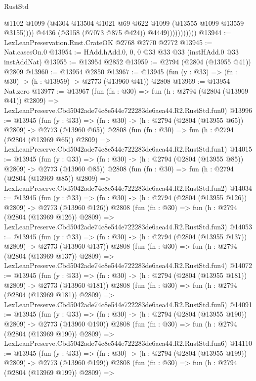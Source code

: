 \begin{lexlean}{RustStd}
\begin{coremodule}
                              @1102
                              @1099
                              (@4304 @13504 @1021 @69 @622 @1099 (@13555 @1099 @13559 @3155))))
                          @4436
                          (@3158 (@7073 @875 @424))
                          @4449)))))))))))
@13944 := LexLeanPreservation.Rust.CrateOK @2768 @2770 @2772
@13945 := Nat.casesOn.{0}
@13954 := HAdd.hAdd.{0, 0, 0} @33 @33 @33 (instHAdd.{0} @33 instAddNat)
@13955 := @13954 @2852
@13959 := @2794 (@2804 (@13955 @41)) @2809
@13960 := @13954 @2850
@13967 := @13945 (fun (y : @33) => (fn : @30) -> (h : @13959) -> @2773 (@13960 @41)) @2808
@13969 := @13954 Nat.zero
@13977 := @13967
    (fun (fn : @30) =>
    fun (h : @2794 (@2804 (@13969 @41)) @2809) =>
    LexLeanPreserve.Cbd5042ade74c8e544e722283de6aea44.R2.RustStd.fun0)
@13996 := @13945
    (fun (y : @33) => (fn : @30) -> (h : @2794 (@2804 (@13955 @65)) @2809) -> @2773 (@13960 @65))
    @2808
    (fun (fn : @30) =>
    fun (h : @2794 (@2804 (@13969 @65)) @2809) =>
    LexLeanPreserve.Cbd5042ade74c8e544e722283de6aea44.R2.RustStd.fun1)
@14015 := @13945
    (fun (y : @33) => (fn : @30) -> (h : @2794 (@2804 (@13955 @85)) @2809) -> @2773 (@13960 @85))
    @2808
    (fun (fn : @30) =>
    fun (h : @2794 (@2804 (@13969 @85)) @2809) =>
    LexLeanPreserve.Cbd5042ade74c8e544e722283de6aea44.R2.RustStd.fun2)
@14034 := @13945
    (fun (y : @33) => (fn : @30) -> (h : @2794 (@2804 (@13955 @126)) @2809) -> @2773 (@13960 @126))
    @2808
    (fun (fn : @30) =>
    fun (h : @2794 (@2804 (@13969 @126)) @2809) =>
    LexLeanPreserve.Cbd5042ade74c8e544e722283de6aea44.R2.RustStd.fun3)
@14053 := @13945
    (fun (y : @33) => (fn : @30) -> (h : @2794 (@2804 (@13955 @137)) @2809) -> @2773 (@13960 @137))
    @2808
    (fun (fn : @30) =>
    fun (h : @2794 (@2804 (@13969 @137)) @2809) =>
    LexLeanPreserve.Cbd5042ade74c8e544e722283de6aea44.R2.RustStd.fun4)
@14072 := @13945
    (fun (y : @33) => (fn : @30) -> (h : @2794 (@2804 (@13955 @181)) @2809) -> @2773 (@13960 @181))
    @2808
    (fun (fn : @30) =>
    fun (h : @2794 (@2804 (@13969 @181)) @2809) =>
    LexLeanPreserve.Cbd5042ade74c8e544e722283de6aea44.R2.RustStd.fun5)
@14091 := @13945
    (fun (y : @33) => (fn : @30) -> (h : @2794 (@2804 (@13955 @190)) @2809) -> @2773 (@13960 @190))
    @2808
    (fun (fn : @30) =>
    fun (h : @2794 (@2804 (@13969 @190)) @2809) =>
    LexLeanPreserve.Cbd5042ade74c8e544e722283de6aea44.R2.RustStd.fun6)
@14110 := @13945
    (fun (y : @33) => (fn : @30) -> (h : @2794 (@2804 (@13955 @199)) @2809) -> @2773 (@13960 @199))
    @2808
    (fun (fn : @30) =>
    fun (h : @2794 (@2804 (@13969 @199)) @2809) =>

\end{coremodule}
\end{lexlean}

